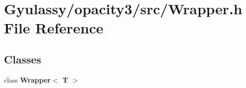\section{Gyulassy/opacity3/src/Wrapper.h File Reference}
\label{Wrapper_8h}
\subsection*{Classes}
\begin{CompactItemize}
\item 
class {\bf Wrapper$<$ T $>$}
\end{CompactItemize}
